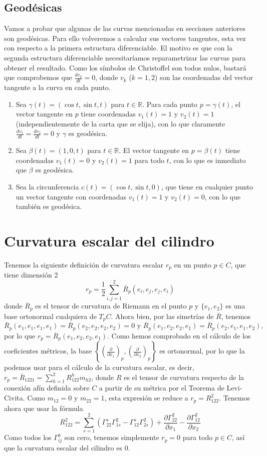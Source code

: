 \documentclass[twoside, 11pt]{article}
\theoremstyle{definition}
\newcommand{\R}{\mathbb{R}}
\newcommand{\parcial}[2]{\frac{\partial #1}{\partial #2}}
\begin{document}
\subsection{Geodésicas}
Vamos a probar que algunas de las curvas mencionadas en secciones anteriores son geodésicas. Para ello volveremos a calcular sus vectores tangentes, esta vez con respecto a la primera estructura diferenciable. El motivo es que con la segunda estructura diferenciable necesitaríamos reparametrizar las curvas para obtener el resultado. Como los símbolos de Christoffel son todos nulos, bastará que comprobemos que $\frac{dv_k}{dt}=0$, donde $v_k$ ($k=1,2$) son las coordenadas del vector tangente a la curva en cada punto. 

\begin{enumerate}
\item Sea $\gamma(t)=(\cos t, \sin t, t)$ para $t\in\R$. Para cada punto $p=\gamma(t)$, el vector tangente en $p$ tiene coordenadas $v_1(t)=1$ y $v_2(t)=1$ (independientemente de la carta que se elija), con lo que claramente $\frac{dv_1}{dt}=\frac{dv_2}{dt}=0$ y $\gamma$ es geodésica.
\item Sea $\beta(t)=(1,0,t)$ para $t\in\R$. El vector tangente en $p=\beta(t)$ tiene coordenadas $v_1(t)=0$ y $v_2(t)=1$ para todo $t$, con lo que es inmediato que $\beta$ es geodésica.
\item Sea la circunferencia $c(t)=(\cos t, \sin t, 0)$, que tiene en cualquier punto un vector tangente con coordenadas $v_1(t)=1$ y $v_2(t)=0$, con lo que también es geodésica.

\end{enumerate}


\section{Curvatura escalar del cilindro}
Tenemos la siguiente definición de curvatura escalar $r_p$ en un punto $p\in C$, que tiene dimensión 2
\[
r_p=\frac{1}{2}\sum_{i,j=1}^2\overline{R}_p(e_i,e_j,e_j,e_i)
\]
donde $\overline{R}_p$ es el tensor de curvatura de Riemann en el punto $p$ y $\{e_1,e_2\}$ es una base ortonormal cualquiera de $T_pC$. 
Ahora bien, por las simetrías de $\overline{R}$, tenemos $$\overline{R}_p(e_1,e_1,e_1,e_1)=\overline{R}_p(e_2,e_2, e_2,e_2)=0\text{ y }\overline{R}_p(e_1,e_2,e_2,e_1)=\overline{R}_p(e_2,e_1,e_1,e_2),$$ por lo que $r_p=\overline{R}_p(e_1,e_2,e_2,e_1)$. Como hemos comprobado en el cálculo de los coeficientes métricos, la base $\left\{\left(\parcial{}{x_1}\right)_p,\left(\parcial{}{x_2}\right)_p\right\}$ es ortonormal, por lo que la podemos usar para el cálculo de la curvatura escalar, es decir, $r_p=\overline{R}_{1221}=\sum_{h=1}^2R^h_{122}m_{h2}$, donde $R$ es el tensor de curvatura respecto de la conexión afín definida sobre $C$ a partir de su métrica por el Teorema de Levi-Civita. Como $m_{12}=0$ y $m_{22}=1$, esta expresión se reduce a $r_p=R^2_{122}$. Tenemos ahora que usar la fórmula
\[
R^2_{122}=\sum_{s=1}^2(\Gamma^s_{22}\Gamma^2_{1s}-\Gamma^s_{12}\Gamma^2_{2s})+\parcial{\Gamma^2_{22}}{x_1}-\parcial{\Gamma^2_{12}}{x_2}
\]
Como todos los $\Gamma^k_{ij}$ son cero, tenemos simplemente $r_p=0$ para todo $p\in C$, así que la curvatura escalar del cilindro es 0.
\end{document}
